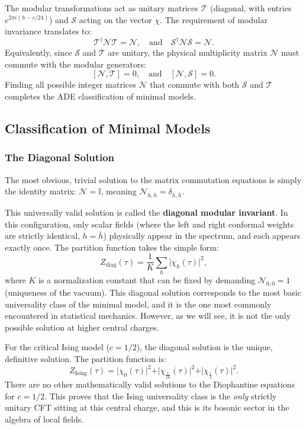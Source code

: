 The modular transformations act as unitary matrices $\mathcal{T}$ (diagonal, with entries $e^{2\pi i(h - c/24)}$) and $\mathcal{S}$ acting on the vector $\chi$. The requirement of modular invariance translates to:
\[
    \mathcal{T}^\dagger \mathcal{N} \mathcal{T} = \mathcal{N}, \quad \text{and} \quad \mathcal{S}^\dagger \mathcal{N} \mathcal{S} = \mathcal{N}.
\]
Equivalently, since $\mathcal{S}$ and $\mathcal{T}$ are unitary, the physical multiplicity matrix $\mathcal{N}$ must commute with the modular generators:
\[
    [\mathcal{N}, \mathcal{T}] = 0, \quad \text{and} \quad [\mathcal{N}, \mathcal{S}] = 0.
\]
Finding all possible integer matrices $\mathcal{N}$ that commute with both $\mathcal{S}$ and $\mathcal{T}$ completes the ADE classification of minimal models.

\subsection{Classification of Minimal Models}

\subsubsection{The Diagonal Solution}

The most obvious, trivial solution to the matrix commutation equations is simply the identity matrix: $\mathcal{N} = \mathbb{I}$, meaning $\mathcal{N}_{h,\bar{h}} = \delta_{h,\bar{h}}$.

This universally valid solution is called the \textbf{diagonal modular invariant}. In this configuration, only scalar fields (where the left and right conformal weights are strictly identical, $h = \bar{h}$) physically appear in the spectrum, and each appears exactly once. The partition function takes the simple form:
\[
    Z_{\mathrm{diag}}(\tau) = \frac{1}{K} \sum_{h} \vert \chi_h(\tau) \vert^2,
\]
where $K$ is a normalization constant that can be fixed by demanding $\mathcal{N}_{0,0} = 1$ (uniqueness of the vacuum). This diagonal solution corresponds to the most basic universality class of the minimal model, and it is the one most commonly encountered in statistical mechanics. However, as we will see, it is not the only possible solution at higher central charges.

\begin{example}
    For the critical Ising model ($c=1/2$), the diagonal solution is the unique, definitive solution. The partition function is:
    \[
        Z_{\mathrm{Ising}}(\tau) = \vert \chi_{0}(\tau) \vert^2 + \vert \chi_{\frac{1}{16}}(\tau) \vert^2 + \vert \chi_{\frac{1}{2}}(\tau) \vert^2.
    \]
    There are no other mathematically valid solutions to the Diophantine equations for $c=1/2$. This proves that the Ising universality class is the \textit{only} strictly unitary CFT sitting at this central charge, and this is its bosonic sector in the algebra of local fields.
\end{example}

